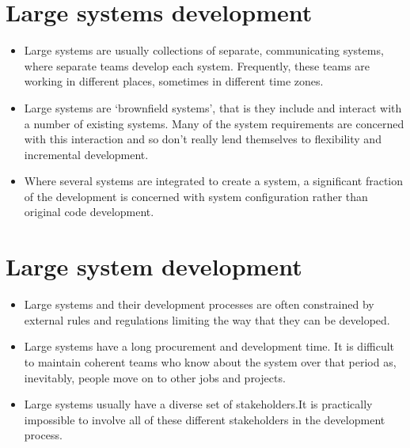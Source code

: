 \section{ Large systems development}
\begin{itemize}

\item Large systems are usually collections of separate, communicating systems, where separate teams develop each system. Frequently, these teams are working in different places, sometimes in different time zones.

\item Large systems are ‘brownfield systems’, that is they include and interact with a number of existing systems. Many of the system requirements are concerned with this interaction and so don’t really lend themselves to flexibility and incremental development.

\item Where several systems are integrated to create a system, a significant fraction of the development is concerned with system configuration rather than original code development.

\end{itemize}
\section{ Large system development}
\begin{itemize}
\item Large systems and their development processes are often constrained by external rules and regulations limiting the way that they can be developed.

\item Large systems have a long procurement and development time. It is difficult to maintain coherent teams who know about the system over that period as, inevitably, people move on to other jobs and projects.

\item Large systems usually have a diverse set of stakeholders.It is practically impossible to involve all of these different stakeholders in the development process.

\end{itemize}
